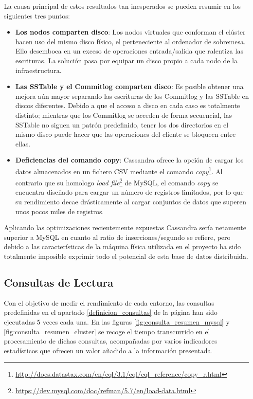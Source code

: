 La causa principal de estos resultados tan inesperados se pueden resumir en los siguientes tres puntos:

\begin{itemize}
	
	\item \textbf{Los nodos comparten disco}: Los nodos virtuales que conforman el clúster hacen uso del mismo disco físico, el perteneciente al ordenador de sobremesa. Ello desemboca en un exceso de operaciones entrada/salida que ralentiza las escrituras. La solución pasa por equipar un disco propio a cada nodo de la infraestructura.
	
	\item \textbf{Las SSTable y el Commitlog comparten disco}: Es posible obtener una mejora aún mayor   separando las escrituras de los Commitlog y las SSTable en discos diferentes. Debido a que el acceso a disco en cada caso es totalmente distinto; mientras que los Commitlog se acceden de forma secuencial, las SSTable no siguen un patrón predefinido, tener los dos directorios en el mismo disco puede hacer que las operaciones del cliente se bloqueen entre ellas. 
	
	\item \textbf{Deficiencias del comando copy}: Cassandra ofrece la opción de cargar los datos almacenados en un fichero CSV mediante el comando \textit{copy}\footnote{\url{http://docs.datastax.com/en/cql/3.1/cql/cql_reference/copy_r.html}}. Al contrario que su homologo \textit{load file}\footnote{\url{https://dev.mysql.com/doc/refman/5.7/en/load-data.html}} de MySQL, el comando \textit{copy} se encuentra diseñado para cargar un número de registros limitados, por lo que su rendimiento decae drásticamente al cargar conjuntos de datos que superen unos pocos miles de registros.
	
\end{itemize}

Aplicando las optimizaciones recientemente expuestas Cassandra sería netamente superior a MySQL en cuanto al ratio de inserciones/segundo se refiere, pero debido a las características de la máquina física utilizada en el proyecto ha sido totalmente imposible exprimir todo el potencial de esta base de datos distribuida.
 
\subsection{Consultas de Lectura}
 
 Con el objetivo de medir el rendimiento de cada entorno, las consultas predefinidas en el apartado \ref{definicion_consultas} de la página \pageref{definicion_consultas} han sido ejecutadas 5 veces cada una. En las figuras \ref{fig:consulta_resumen_mysql} y \ref{fig:consulta_resumen_cluster} se
 recoge el tiempo transcurrido en el procesamiento de dichas consultas, acompañadas por varios indicadores estadísticos que ofrecen un valor añadido a la información presentada.
 
